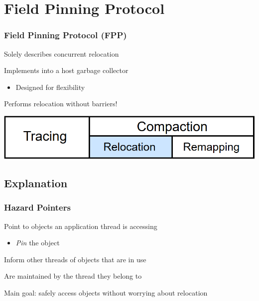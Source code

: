 \documentclass{beamer}
\newcommand{\linespace}{\vskip 0.25cm}
\begin{document}
\section[FPP]{Field Pinning Protocol}

\begin{frame}

\frametitle{Field Pinning Protocol (FPP)}

Solely describes concurrent relocation

\linespace
\linespace

Implements into a host garbage collector
\begin{itemize}
\item Designed for flexibility
\end{itemize}

\linespace
\linespace

Performs relocation without barriers!

\linespace
\linespace
\linespace
\linespace

\begin{center}
\includegraphics[width=.85\textwidth]{Illustrations/gc_cycle_locator_relocation.png}
\end{center}

\end{frame}



\subsection*{Explanation}

\begin{frame}

\frametitle{Hazard Pointers}

Point to objects an application thread is accessing
\begin{itemize}
\item \emph{Pin} the object
\end{itemize}

\linespace
\linespace

Inform other threads of objects that are in use

\linespace
\linespace

Are maintained by the thread they belong to

\linespace
\linespace

Main goal: safely access objects without worrying about relocation



\end{frame}
\end{document}
